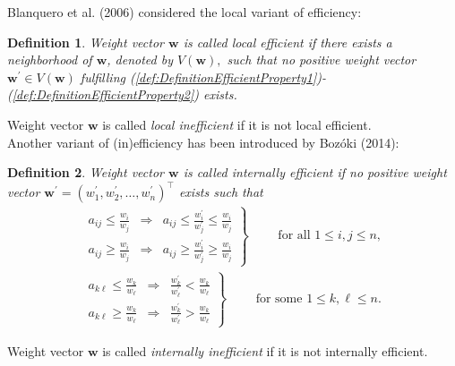 \documentclass{article}
\theoremstyle{plain}
\newtheorem{definition}{Definition}[section]
\begin{document}
Blanquero et al. (2006) considered the local variant of ef{\kern0pt}f{\kern0pt}iciency:
\begin{definition} \label{def:DefinitionlocalEfficient} %
Weight vector $\mathbf{w}$ is called \emph{local ef{\kern0pt}f{\kern0pt}icient}
if there exists a neighborhood of $\mathbf{w}$, denoted by $V(\mathbf{w}),$
such that no positive weight vector $\mathbf{w^{\prime}} \in V(\mathbf{w}) $
fulf{\kern0pt}illing (\ref{def:DefinitionEfficientProperty1})-(\ref{def:DefinitionEfficientProperty2}) exists.
\end{definition}
Weight vector $\mathbf{w}$ is called \emph{local inef{\kern0pt}f{\kern0pt}icient} if it is
not local ef{\kern0pt}f{\kern0pt}icient. \\


Another variant of (in)ef{\kern0pt}f{\kern0pt}iciency has been introduced
by Boz\'oki (2014):
\begin{definition} \label{def:DefinitionInternallyEfficient} %
Weight vector $\mathbf{w}$ is called \emph{internally ef{\kern0pt}f{\kern0pt}icient} if
no positive weight vector \linebreak
$\mathbf{w^{\prime}} = (w^{\prime}_1, w^{\prime}_2, \ldots, w^{\prime}_n)^{\top}$
exists such that
\begin{align}
\left.
\begin{array}{ccc}
a_{ij} \leq \frac{w_i}{w_j} & \Longrightarrow &
a_{ij} \leq \frac{w^{\prime}_i}{w^{\prime}_j} \leq \frac{w_i}{w_j} \\
a_{ij} \geq \frac{w_i}{w_j} & \Longrightarrow &
a_{ij} \geq \frac{w^{\prime}_i}{w^{\prime}_j} \geq \frac{w_i}{w_j}
\end{array}
\right\}
\qquad
\text{ for all } 1 \leq i,j \leq n, \label{def:DefinitionInternallyEfficientProperty1}  \\   %
\left.
\begin{array}{ccc}
a_{k{\ell}} \leq \frac{w_k}{w_{\ell}} & \Longrightarrow &
\frac{w^{\prime}_k}{w^{\prime}_{\ell}} < \frac{w_k}{w_{\ell}} \\
a_{k{\ell}} \geq \frac{w_k}{w_{\ell}} & \Longrightarrow &
\frac{w^{\prime}_k}{w^{\prime}_{\ell}} > \frac{w_k}{w_{\ell}}
\end{array}
\right\}
\qquad
\text{ for some } 1 \leq k,\ell \leq n.  \label{def:DefinitionInternallyEfficientProperty2}    %
\end{align}
\end{definition}
Weight vector $\mathbf{w}$ is called \emph{internally inef{\kern0pt}f{\kern0pt}icient}
if it is not internally ef{\kern0pt}f{\kern0pt}icient. \\
\end{document}
